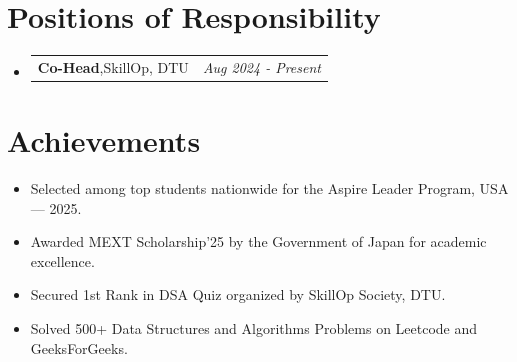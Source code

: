 \documentclass[a4paper,12pt]{article}
\makeatletter
\newcommand{\resumePOR}[3]{
\vspace{0.5mm}\item
    \begin{tabular*}{0.97\textwidth}[t]{l@{\extracolsep{\fill}}r}
        \textbf{#1},\hspace{0.3mm}#2 & \textit{\small{#3}} 
    \end{tabular*}
    \vspace{-2mm}
}
\newcommand{\resumeSubheading}[4]{
\vspace{0.5mm}\item
    \begin{tabular*}{0.98\textwidth}[t]{l@{\extracolsep{\fill}}r}
        \textbf{#1} & \textit{\footnotesize{#4}} \\
        \textit{\footnotesize{#3}} &  \footnotesize{#2}\\
    \end{tabular*}
    \vspace{-2.4mm}
}
\newcommand{\resumeSubHeadingListStart}{\begin{itemize}[leftmargin=*,labelsep=0mm]}
\newcommand{\resumeItemListStart}{\begin{justify}\begin{itemize}[leftmargin=3ex, rightmargin=2ex, noitemsep,labelsep=1.2mm,itemsep=0mm]\small}
\newcommand{\resumeSubHeadingListEnd}{\end{itemize}\vspace{2mm}}
\newcommand{\resumeItemListEnd}{\end{itemize}\end{justify}\vspace{-2mm}}
\makeatother
\begin{document}

\section{\textbf{Positions of Responsibility}}
\vspace{-0.4mm}
\resumeSubHeadingListStart

\resumePOR
{Co-Head}
{SkillOp, DTU}
{Aug 2024 - Present}

\resumeSubHeadingListEnd
\vspace{-4mm}

\section{\textbf{Achievements}}
\vspace{-0.1mm}
\resumeItemListStart
\item Selected among top students nationwide for the Aspire Leader Program, USA — 2025.
\item Awarded MEXT Scholarship’25 by the Government of Japan for academic excellence.
\item Secured 1st Rank in DSA Quiz organized by SkillOp Society, DTU.
\item Solved 500+ Data Structures and Algorithms Problems on Leetcode and GeeksForGeeks.
\resumeItemListEnd

\end{document}
